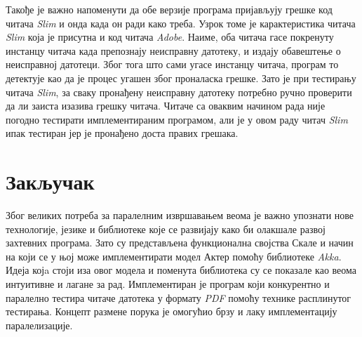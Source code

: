 \documentclass[12pt,oneside]{memoir}
\begin{document}
Такође је важно напоменути да обе верзије програма пријављују грешке код читача \textit{Slim} и онда када он ради како треба. Узрок томе је карактеристика читача \textit{Slim} која је присутна и код читача \textit{Adobe}. Наиме, оба читача гасе покренуту инстанцу читача када препознају неисправну датотеку, и издају обавештење о неисправној датотеци. Због тога што сами угасе инстанцу читача, програм то детектује као да је процес угашен због проналаска грешке. Зато је при тестирању читача \textit{Slim}, за сваку пронађену неисправну датотеку потребно ручно проверити да ли заиста изазива грешку читача. Читаче са оваквим начином рада није погодно тестирати имплементираним програмом, али је у овом раду читач \textit{Slim} ипак тестиран јер је пронађено доста правих грешака. 




%



\chapter{Закључак}
\label{chp:zakljucak}


Због великих потреба за паралелним извршавањем веома је важно упознати нове технологије, језике и библиотеке које се развијају како би олакшале развој захтевних програма. Зато су представљена функционална својства Скале и начин на који се у њој може имплементирати модел Актер помоћу библиотеке \textit{Akka}. Идеја којa стоји иза овог модела и поменута библиотека су се показале као веома интуитивне и лагане за рад. Имплементиран је програм који конкурентно и паралелно тестира читаче датотека у формату \textit{PDF} помоћу технике расплинутог тестирања. Концепт размене порука је омогућио брзу и лаку имплементацију паралелизације. 
\end{document}

